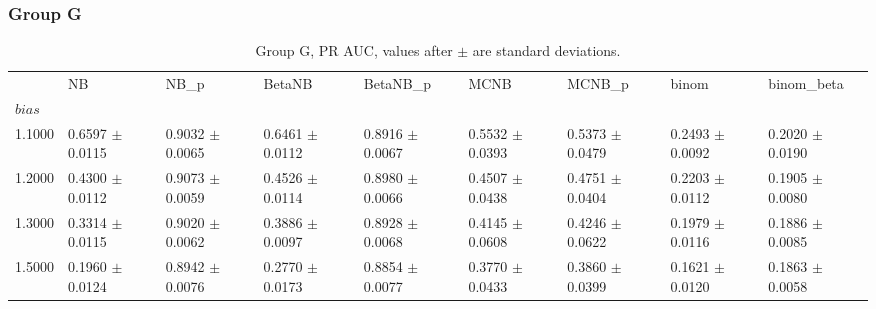 \subsubsection*{Group G}
\begin{table}[H]
\centering
\begin{adjustbox}{max width=\linewidth}
\begin{tabular}{lllllllll}
\toprule
 & NB & NB\_p & BetaNB & BetaNB\_p & MCNB & MCNB\_p & binom & binom\_beta \\
$bias$ &  &  &  &  &  &  &  &  \\
\midrule
1.1000 & 0.6597 $\pm$ 0.0115 & 0.9032 $\pm$ 0.0065 & 0.6461 $\pm$ 0.0112 & 0.8916 $\pm$ 0.0067 & 0.5532 $\pm$ 0.0393 & 0.5373 $\pm$ 0.0479 & 0.2493 $\pm$ 0.0092 & 0.2020 $\pm$ 0.0190 \\
1.2000 & 0.4300 $\pm$ 0.0112 & 0.9073 $\pm$ 0.0059 & 0.4526 $\pm$ 0.0114 & 0.8980 $\pm$ 0.0066 & 0.4507 $\pm$ 0.0438 & 0.4751 $\pm$ 0.0404 & 0.2203 $\pm$ 0.0112 & 0.1905 $\pm$ 0.0080 \\
1.3000 & 0.3314 $\pm$ 0.0115 & 0.9020 $\pm$ 0.0062 & 0.3886 $\pm$ 0.0097 & 0.8928 $\pm$ 0.0068 & 0.4145 $\pm$ 0.0608 & 0.4246 $\pm$ 0.0622 & 0.1979 $\pm$ 0.0116 & 0.1886 $\pm$ 0.0085 \\
1.5000 & 0.1960 $\pm$ 0.0124 & 0.8942 $\pm$ 0.0076 & 0.2770 $\pm$ 0.0173 & 0.8854 $\pm$ 0.0077 & 0.3770 $\pm$ 0.0433 & 0.3860 $\pm$ 0.0399 & 0.1621 $\pm$ 0.0120 & 0.1863 $\pm$ 0.0058 \\
\bottomrule
\end{tabular}

\end{adjustbox}
\caption{Group G, PR AUC, values after $\pm$ are standard deviations.}
\end{table}

